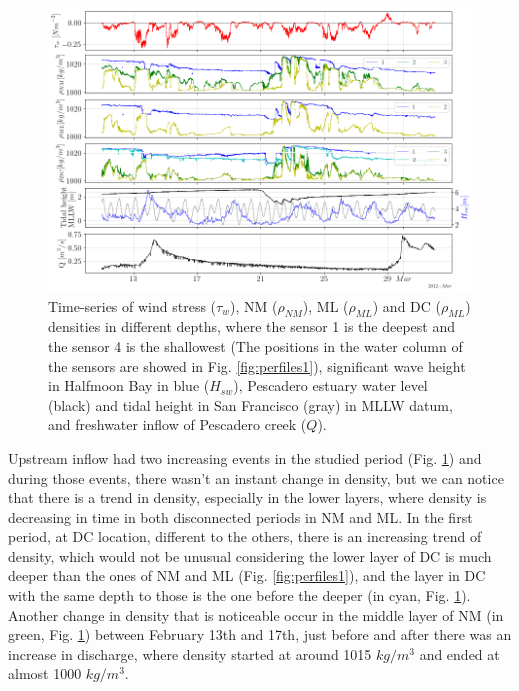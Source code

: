 \documentclass[11pt,letterpaper]{article}
\begin{document}
\begin{figure}[h!]
    \centering
    \includegraphics[width=\textwidth]{Imagenes/dens.png}
    \caption{Time-series of wind stress ($\tau_w$), NM ($\rho_{NM}$), ML ($\rho_{ML}$) and DC ($\rho_{ML}$) densities in different depths, where the sensor 1 is the deepest and the sensor 4 is the shallowest (The positions in the water column of the sensors are showed in Fig. \ref{fig:perfiles1}), significant wave height in Halfmoon Bay in blue ($H_{sw}$), Pescadero estuary water level (black) and tidal height in San Francisco (gray) in MLLW datum, and freshwater inflow of Pescadero creek ($Q$).}
    \label{fig:dens}
\end{figure}


Upstream inflow had two increasing events in the studied period (Fig. \ref{fig:dens}) and during those events, there wasn't an instant change in density, but we can notice that there is a trend in density, especially in the lower layers, where density is decreasing in time in both disconnected periods in NM and ML. In the first period, at DC location, different to the others, there is an increasing trend of density, which would not be unusual considering the lower layer of DC is much deeper than the ones of NM and ML (Fig. \ref{fig:perfiles1}), and the layer in DC with the same depth to those is the one before the deeper (in cyan, Fig. \ref{fig:dens}). Another change in density that is noticeable occur in the middle layer of NM (in green, Fig. \ref{fig:dens}) between February 13th and 17th, just before and after there was an increase in discharge, where density started at around 1015 $kg/m^3$ and ended at almost 1000 $kg/m^3$. \\
\end{document}
